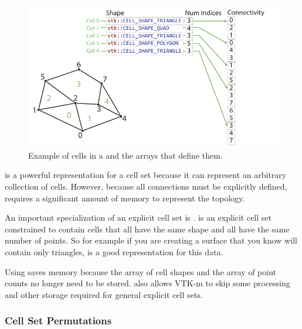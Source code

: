 \begin{figure}
  \centering
  \includegraphics{images/ExplicitCellConnections}
  \caption{Example of cells in a  and the
    arrays that define them.}
  \label{fig:CellSetExplicit}
\end{figure}

 is a powerful representation for a cell set
because it can represent an arbitrary collection of cells. However, because
all connections must be explicitly defined,
 requires a significant amount of memory to
represent the topology.


An important specialization of an explicit cell set is
.  is an
explicit cell set constrained to contain cells that all have the same shape
and all have the same number of points. So for example if you are creating
a surface that you know will contain only triangles,
 is a good representation for this data.

Using  saves memory because the array of
cell shapes and the array of point counts no longer need to be stored.
 also allows VTK-m to skip some
processing and other storage required for general explicit cell sets.



\subsubsection{Cell Set Permutations}


